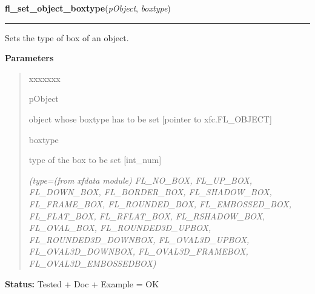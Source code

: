 \hspace{.8\funcindent}\begin{boxedminipage}{\funcwidth}

    \raggedright \textbf{fl\_set\_object\_boxtype}(\textit{pObject}, \textit{boxtype})

    \vspace{-1.5ex}

    \rule{\textwidth}{0.5\fboxrule}
\setlength{\parskip}{2ex}
    Sets the type of box of an object.

\setlength{\parskip}{1ex}
      \textbf{Parameters}
      \vspace{-1ex}

      \begin{quote}
        \begin{Ventry}{xxxxxxx}

          \item[pObject]

          object whose boxtype has to be set [pointer to xfc.FL\_OBJECT]

          \item[boxtype]

          type of the box to be set [int\_num]

            {\it (type=(from xfdata module) FL\_NO\_BOX, FL\_UP\_BOX, FL\_DOWN\_BOX, 
FL\_BORDER\_BOX, FL\_SHADOW\_BOX, FL\_FRAME\_BOX, FL\_ROUNDED\_BOX, 
FL\_EMBOSSED\_BOX, FL\_FLAT\_BOX, FL\_RFLAT\_BOX, FL\_RSHADOW\_BOX, 
FL\_OVAL\_BOX, FL\_ROUNDED3D\_UPBOX, FL\_ROUNDED3D\_DOWNBOX, 
FL\_OVAL3D\_UPBOX, FL\_OVAL3D\_DOWNBOX, FL\_OVAL3D\_FRAMEBOX, 
FL\_OVAL3D\_EMBOSSEDBOX)}

        \end{Ventry}

      \end{quote}

\textbf{Status:} Tested + Doc + Example = OK



    \end{boxedminipage}

    \label{xformslib:library:fl_get_object_boxtype}

    \vspace{0.5ex}

